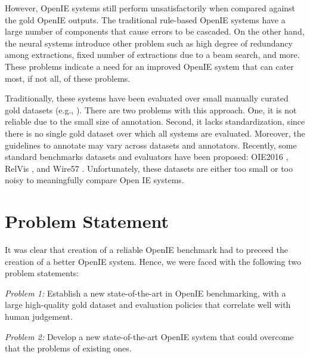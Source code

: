   However, OpenIE systems still perform unsatisfactorily when compared against the gold OpenIE outputs. The traditional rule-based OpenIE systems have a large number of components that cause errors to be cascaded. On the other hand, the neural systems introduce other problem such as high degree of redundancy among extractions, fixed number of extractions due to a beam search, and more. These problems indicate a need for an improved OpenIE system that can cater most, if not all, of these problems.
  
  
  Traditionally, these systems have been evaluated over small manually curated gold datasets (e.g., \cite{ReVerb1, Ollie}). There are two problems with this approach. One, it is not reliable due to the small size of annotation. Second, it lacks standardization, since there is no single gold dataset over which all systems are evaluated. Moreover, the guidelines to annotate may vary across datasets and annotators. Recently, some standard benchmarks datasets and evaluators have been proposed: OIE2016 \cite{OIE2016}, RelVis \cite{Relvis}, and  Wire57 \cite{Wire57}. Unfortunately, these datasets are either too small or too noisy to meaningfully compare Open IE systems.

\section{Problem Statement}

  It was clear that creation of a reliable OpenIE benchmark had to preceed the creation of a better OpenIE system. Hence, we were faced with the following two problem statements:

  \textit{Problem 1:} Establish a new state-of-the-art in OpenIE benchmarking, with a large high-quality gold dataset and evaluation policies that correlate well with human judgement.

  \textit{Problem 2:} Develop a new state-of-the-art OpenIE system that could overcome that the problems of existing ones.
  
